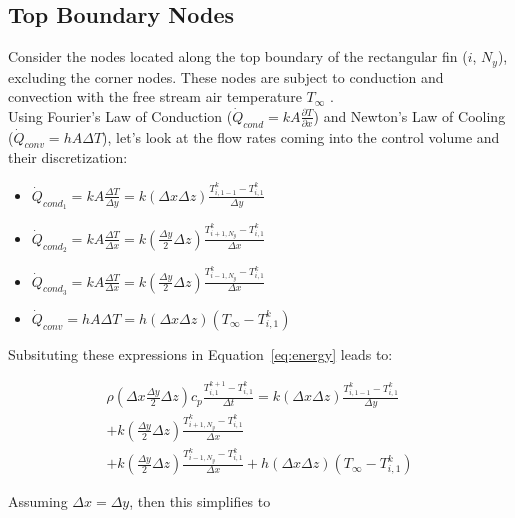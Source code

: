 \documentclass{article}
\newcommand{\pderiv}[2]{\displaystyle \frac{\partial #1}{\partial #2}}
\newcommand{\ddfrac}[2]{\frac{\displaystyle #1}{\displaystyle #2}}
\begin{document}
\subsection{Top Boundary Nodes}

Consider the nodes located along the top boundary of the rectangular fin ($i$, $N_y$), excluding the corner nodes. These nodes are subject to conduction and convection with the free stream air temperature $T_{\infty}$ .\\

Using Fourier's Law of Conduction ($\dot{Q}_{cond} = kA\pderiv{T}{x}$) and Newton's Law of Cooling ($\dot{Q}_{conv} = hA\Delta T$), let's look at the flow rates coming into the control volume and their discretization:

\begin{itemize}
    \item $\dot{Q}_{cond_{1}} = kA\ddfrac{\Delta T}{\Delta y} = k(\Delta x \Delta z) \ddfrac{T_{i,1-1}^k - T_{i,1}^k}{\Delta y}$
    \item $\dot{Q}_{cond_{2}} = kA\ddfrac{\Delta T}{\Delta x} = k(\ddfrac{\Delta y}{2} \Delta z) \ddfrac{T_{i+1,N_y}^k - T_{i,1}^k}{\Delta x}$
    \item $\dot{Q}_{cond_{3}} = kA\ddfrac{\Delta T}{\Delta x} = k(\ddfrac{\Delta y}{2} \Delta z) \ddfrac{T_{i-1,N_y}^k - T_{i,1}^k}{\Delta x}$
    \item $\dot{Q}_{conv} = hA\Delta T = h(\Delta x \Delta z)\left(T_{\infty} - T_{i,1}^k\right)$
\end{itemize}

Subsituting these expressions in Equation~\eqref{eq:energy} leads to:

\begin{multline*}
    \rho\left(\Delta x \ddfrac{\Delta y}{2} \Delta z\right) c_p \ddfrac{T_{i,1}^{k+1} - T_{i,1}^k}{\Delta t} = k(\Delta x \Delta z) \ddfrac{T_{i,1-1}^k - T_{i,1}^k}{\Delta y} \\
    + k(\ddfrac{\Delta y}{2} \Delta z) \ddfrac{T_{i+1,N_y}^k - T_{i,1}^k}{\Delta x} \\
    + k(\ddfrac{\Delta y}{2} \Delta z) \ddfrac{T_{i-1,N_y}^k - T_{i,1}^k}{\Delta x}
    + h(\Delta x \Delta z)\left(T_{\infty} - T_{i,1}^k\right)
\end{multline*}

Assuming $\Delta x = \Delta y$, then this simplifies to 
\begin{center}
    \noindent {}        
\end{center}
\end{document}

